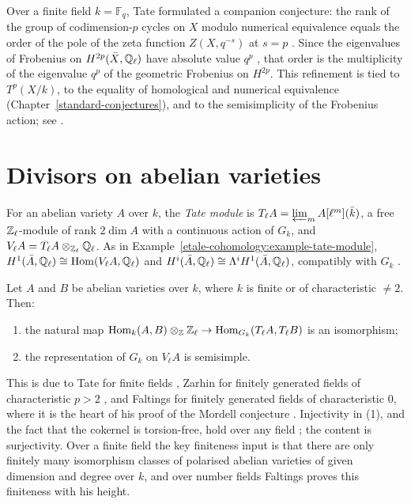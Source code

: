 \begin{remark}\label{tate-conjecture:remark-poles}
Over a finite field $k = \mathbb{F}_q$, Tate formulated a companion conjecture: the rank of the group of codimension-$p$ cycles on $X$ modulo numerical equivalence equals the order of the pole of the zeta
function $Z(X, q^{-s})$ at $s = p$ \cite{tate-1965}. Since the eigenvalues of Frobenius on $H^{2p}(\bar X, \mathbb{Q}_\ell)$ have absolute value $q^p$ \cite{deligne-weil-1}, that order is the multiplicity of the
eigenvalue $q^p$ of the geometric Frobenius on $H^{2p}$. This refinement is tied to $T^p(X/k)$, to the equality of homological and numerical equivalence (Chapter~\ref{standard-conjectures}), and to the
semisimplicity of the Frobenius action; see \cite{totaro-2017}.
\end{remark}

\section{Divisors on abelian varieties}\label{tate-conjecture:section-abelian}

For an abelian variety $A$ over $k$, the \emph{Tate module} is $T_\ell A = \varprojlim_mA[\ell^m](\bar k)$, a free $\mathbb{Z}_\ell$-module of rank $2\dim A$ with a continuous action of $G_k$, and
$V_\ell A = T_\ell A \otimes_{\mathbb{Z}_\ell}\mathbb{Q}_\ell$. As in Example~\ref{etale-cohomology:example-tate-module}, $H^1(\bar A, \mathbb{Q}_\ell) \cong \operatorname{Hom}(V_\ell A, \mathbb{Q}_\ell)$ and $H^i(\bar A, \mathbb{Q}_\ell) \cong \Lambda^iH^1(\bar A, \mathbb{Q}_\ell)$,
compatibly with $G_k$ \cite{milne-etale}.

\begin{theorem}\label{tate-conjecture:theorem-isogeny}
Let $A$ and $B$ be abelian varieties over $k$, where $k$ is finite or of characteristic $\neq 2$. Then:
\begin{enumerate}
\item the natural map $\operatorname{Hom}_k(A, B) \otimes_{\mathbb{Z}}\mathbb{Z}_\ell \to \operatorname{Hom}_{G_k}(T_\ell A, T_\ell B)$ is an isomorphism;
\item the representation of $G_k$ on $V_\ell A$ is semisimple.
\end{enumerate}
\end{theorem}

This is due to Tate for finite fields \cite{tate-1966}, Zarhin for finitely generated fields of characteristic $p > 2$ \cite{zarhin-1975}, and Faltings for finitely generated fields of characteristic $0$,
where it is the heart of his proof of the Mordell conjecture \cite{faltings-1983}. Injectivity in (1), and the fact that the cokernel is torsion-free, hold over any field
\cite{mumford-abelian}; the content is surjectivity. Over a finite field the key finiteness input is that there are only finitely many isomorphism classes of polarised abelian varieties of given dimension and
degree over $k$, and over number fields Faltings proves this finiteness with his height.


